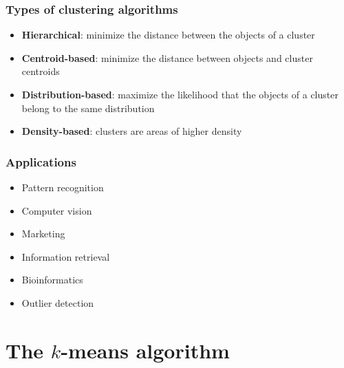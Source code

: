 \documentclass[10pt]{beamer}
\begin{document}
\begin{frame}
  \frametitle{Types of clustering algorithms}
  \begin{itemize}
	\item {\bf Hierarchical}: minimize the {\color{red} distance} between the objects of a cluster
	\item {\bf Centroid-based}: minimize the distance between objects and cluster {\color{red} centroids}
	\item {\bf Distribution-based}: maximize the likelihood that the objects of a cluster belong to the same
		{\color{red} distribution}
	\item {\bf Density-based}: clusters are areas of higher {\color{red} density}
  \end{itemize}
\end{frame}

\begin{frame}
  \frametitle{Applications}
  \begin{itemize}
    \item Pattern recognition
	\item Computer vision
	\item Marketing
	\item Information retrieval
	\item Bioinformatics
	\item Outlier detection
  \end{itemize}
\end{frame}

\section{The $k$-means algorithm}
\end{document}
